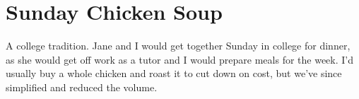\section[Chicken Soup]{Sunday Chicken Soup}

\begin{recipestats}[
        servings=8,
        preptime=1 \hour,
        bakingtime=2 \hour,
        source=Mike \& Jane,
    ]
\end{recipestats}

\begin{recipeabstract}
    A college tradition.
    Jane and I would get together Sunday in college for dinner,
    as she would get off work as a tutor and I would prepare meals for the week.
    I'd usually buy a whole chicken and roast it to cut down on cost,
    but we've since simplified and reduced the volume.
\end{recipeabstract}

\begin{ingredientcolumns}
    \begin{ingredientblock}
        \\
        \\
        \\
        \\
        \\
    \end{ingredientblock}
    \begin{ingredientblock}
        \\
        \\
        \\
        \\
        \\
    \end{ingredientblock}
\end{ingredientcolumns}


